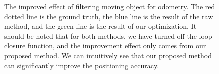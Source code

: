 \documentclass[lettersize,journal]{IEEEtran}
\begin{document}
\begin{figure}[h]
\begin{center}

\caption{The improved effect of filtering moving object for odometry. The red dotted line is the ground truth, the blue line is the result of the raw method, and the green line is the result of our optimization. It should be noted that for both methods, we have turned off the loop-closure function, and the improvement effect only comes from our proposed method. We can intuitively see that our proposed method can significantly improve the positioning accuracy.}
\label{fig9}
\end{center}
\end{figure}
\end{document}
